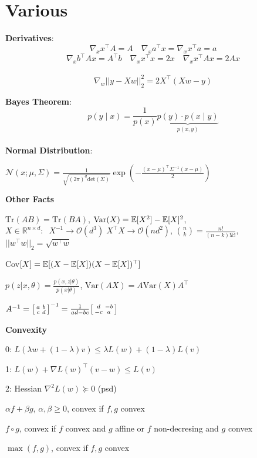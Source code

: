 \section*{Various}

\textbf{Derivatives}:
$$\nabla_x x^\top A = A \quad \nabla_x a^\top x = \nabla_x x^\top a = a$$
$$\nabla_x b^\top A x = A^\top b \quad \nabla_x x^\top x = 2x \quad \nabla_x x^\top A x = 2 Ax$$\\[-20pt]
$$\nabla_w || y-Xw||_2^2 = 2X^\top(Xw-y)$$

\textbf{Bayes Theorem}: \\[-13pt]
$$p(y \; | \; x) = \frac{1}{p(x)} \underbrace{p(y) \cdot p(x \; | \; y)}_{p(x,y)}$$ \\[-23pt]

\textbf{Normal Distribution}:

$\mathcal{N}(x; \mu, \Sigma) = \frac{1}{\sqrt{(2 \pi)^d \text{det}(\Sigma)}} \exp(-\frac{(x - \mu)^\top \Sigma^{-1} (x-\mu)}{2})$

\textbf{Other Facts}

$\text{Tr}(AB) = \text{Tr}(BA)$, $\text{Var}(X) = \mathbb{E}[X^2] - \mathbb{E}[X]^2$, $X \in \mathbb{R}^{n \times d}: \; \; X^{-1} \rightarrow \mathcal{O}(d^3) \; X^\top X \rightarrow \mathcal{O}(nd^2)$, $\binom{n}{k} = \frac{n!}{(n-k)!k!}$, $||w^\top w||_2 = \sqrt{w^\top w}$
 
Cov$[X] = \mathbb{E}[(X- \mathbb{E}[X])(X- \mathbb{E}[X])^\top]$

$p(z|x,\theta) = \frac{p(x,z|\theta)}{p(x | \theta)}$, $\text{Var}(AX) = A \text{Var}(X) A^\top$


$A^{-1}=
\begin{bsmallmatrix}
a&b \\ 
c&d
\end{bsmallmatrix}^{-1}=\frac{1}{ad-bc}
\begin{bsmallmatrix}
d&-b \\ 
-c&a
\end{bsmallmatrix}
$

\textbf{Convexity}

0: $L(\lambda w + (1 - \lambda)v) \leq \lambda L (w) + (1- \lambda) L(v)$

1: $L(w) + \nabla L(w)^\top (v - w) \leq L(v)$

2: Hessian $\nabla^2 L (w) \succcurlyeq 0$ (psd)

\begin{compactitem}
	\item $\alpha f + \beta g$, $\alpha, \beta \geq 0$, convex if $f, g$ convex
	\item $f \circ g$, convex if $f$ convex and $g$ affine or $f$ non-decresing and $g$ convex
	\item $\max(f, g)$, convex if $f,g$ convex
\end{compactitem}
